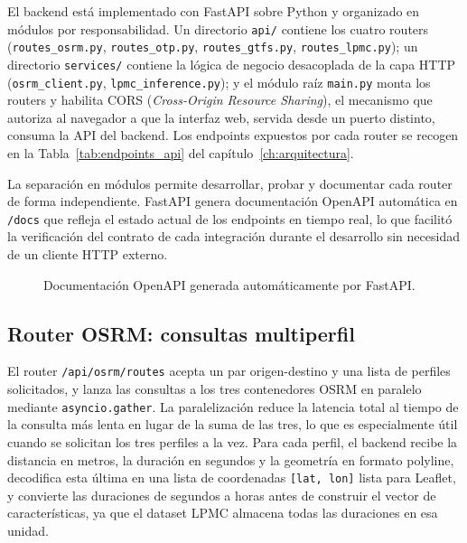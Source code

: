 El backend está implementado con FastAPI sobre Python y organizado en módulos por responsabilidad. Un directorio \texttt{api/} contiene los cuatro routers (\texttt{routes\_osrm.py}, \texttt{routes\_otp.py}, \texttt{routes\_gtfs.py}, \texttt{routes\_lpmc.py}); un directorio \texttt{services/} contiene la lógica de negocio desacoplada de la capa HTTP (\texttt{osrm\_client.py}, \texttt{lpmc\_inference.py}); y el módulo raíz \texttt{main.py} monta los routers y habilita CORS (\textit{Cross-Origin Resource Sharing}), el mecanismo que autoriza al navegador a que la interfaz web, servida desde un puerto distinto, consuma la API del backend. Los endpoints expuestos por cada router se recogen en la Tabla~\ref{tab:endpoints_api} del capítulo~\ref{ch:arquitectura}.

La separación en módulos permite desarrollar, probar y documentar cada router de forma independiente. FastAPI genera documentación OpenAPI automática en \texttt{/docs} que refleja el estado actual de los endpoints en tiempo real, lo que facilitó la verificación del contrato de cada integración durante el desarrollo sin necesidad de un cliente HTTP externo.

\begin{figure}[htbp]
  \centering
  \caption{Documentación OpenAPI generada automáticamente por FastAPI.}
  \label{fig:fastapi_docs}
\end{figure}

\subsection{Router OSRM: consultas multiperfil}
\label{subsec:impl_backend_osrm}

El router \texttt{/api/osrm/routes} acepta un par origen-destino y una lista de perfiles solicitados, y lanza las consultas a los tres contenedores OSRM en paralelo mediante \texttt{asyncio.gather}. La paralelización reduce la latencia total al tiempo de la consulta más lenta en lugar de la suma de las tres, lo que es especialmente útil cuando se solicitan los tres perfiles a la vez. Para cada perfil, el backend recibe la distancia en metros, la duración en segundos y la geometría en formato polyline, decodifica esta última en una lista de coordenadas \texttt{[lat, lon]} lista para Leaflet, y convierte las duraciones de segundos a horas antes de construir el vector de características, ya que el dataset LPMC almacena todas las duraciones en esa unidad.

